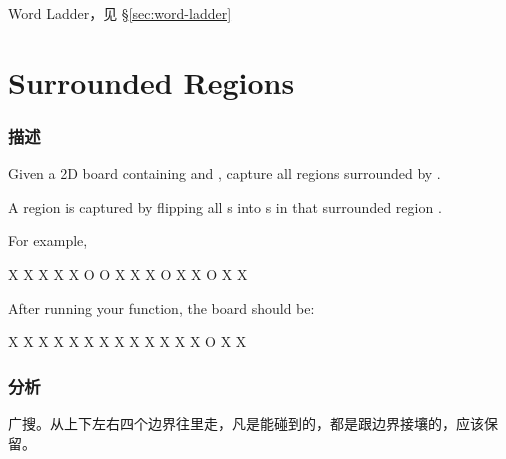 \begindot
\item Word Ladder，见 \S \ref{sec:word-ladder}
\myenddot


\section{Surrounded Regions} %
\label{sec:surrounded-regions}


\subsubsection{描述}
Given a 2D board containing  and , capture all regions surrounded by .

A region is captured by flipping all s into s in that surrounded region .

For example,
\begin{Code}
	X X X X
	X O O X
	X X O X
	X O X X
\end{Code}

After running your function, the board should be:
\begin{Code}
	X X X X
	X X X X
	X X X X
	X O X X
\end{Code}


\subsubsection{分析}
广搜。从上下左右四个边界往里走，凡是能碰到的，都是跟边界接壤的，应该保留。


